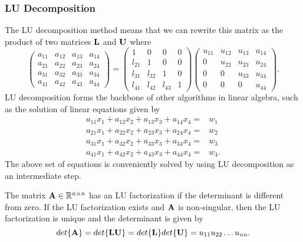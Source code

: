 \documentclass[compress]{beamer}
\begin{document}
\frame
{
  \frametitle{LU Decomposition}
\begin{small}
{\scriptsize
The LU decomposition method means that we can rewrite
this matrix as the product of two matrices ${\bf L}$ and ${\bf U}$
where
\[
\label{eq3}
   \left(\begin{array}{cccc}
                          a_{11} & a_{12} & a_{13} & a_{14} \\
                          a_{21} & a_{22} & a_{23} & a_{24} \\
                          a_{31} & a_{32} & a_{33} & a_{34} \\
                          a_{41} & a_{42} & a_{43} & a_{44}
                      \end{array} \right)
                      = \left( \begin{array}{cccc}
                              1  & 0      & 0      & 0 \\
                          l_{21} & 1      & 0      & 0 \\
                          l_{31} & l_{32} & 1      & 0 \\
                          l_{41} & l_{42} & l_{43} & 1
                      \end{array} \right)
                        \left( \begin{array}{cccc}
                          u_{11} & u_{12} & u_{13} & u_{14} \\
                               0 & u_{22} & u_{23} & u_{24} \\
                               0 & 0      & u_{33} & u_{34} \\
                               0 & 0      &  0     & u_{44}
             \end{array} \right).
\]
LU decomposition forms the backbone of other algorithms in linear algebra, such as the
solution of linear equations given by
\begin{eqnarray}
 a_{11}x_1 +a_{12}x_2 +a_{13}x_3 + a_{14}x_4=&w_1 \nonumber \\
a_{21}x_1 + a_{22}x_2 + a_{23}x_3 + a_{24}x_4=&w_2 \nonumber \\
a_{31}x_1 + a_{32}x_2 + a_{33}x_3 + a_{34}x_4=&w_3 \nonumber \\
a_{41}x_1 + a_{42}x_2 + a_{43}x_3 + a_{44}x_4=&w_4.  \nonumber
\end{eqnarray}
The above set of equations is conveniently solved by using LU decomposition as an intermediate step.

The matrix ${\bf A}\in \mathbb{R}^{n\times n}$ has an LU factorization if the determinant
is different from zero. If the LU factorization exists and ${\bf A}$ is non-singular, then the LU factorization
is unique and the determinant is given by
\[
det\{{\bf A}\}=det\{{\bf LU}\}= det\{{\bf L}\}det\{{\bf U}\}=u_{11}u_{22}\dots u_{nn}.
\]
}
\end{small}
}
\end{document}
